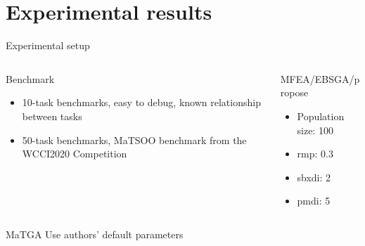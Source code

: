\section{Experimental results}


\begin{frame}{Experimental setup}
    \begin{columns}
        \begin{column}{0.51\linewidth}
            \begin{exampleblock}{Benchmark}
            \begin{itemize}
                \item 10-task benchmarks, easy to debug, known relationship between tasks
                \item 50-task benchmarks, MaTSOO benchmark from the WCCI2020 Competition
            \end{itemize}
        \end{exampleblock}
        \end{column}
        \begin{column}{0.48\textwidth}
            \begin{exampleblock}{MFEA/EBSGA/\gls{propose}}
                \begin{itemize}
                    \item Population size: 100
                    \item rmp: 0.3
                    \item sbxdi: 2
                    \item pmdi: 5
                \end{itemize}
            \end{exampleblock}
        \end{column}
    \end{columns}
    \begin{exampleblock}{MaTGA}
        Use authors' default parameters
    \end{exampleblock}
\end{frame}

